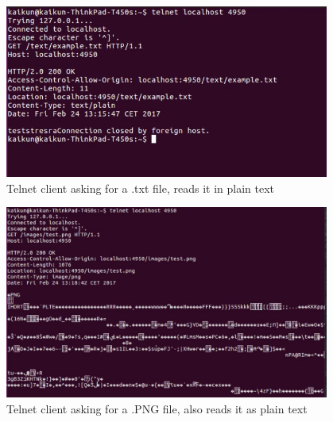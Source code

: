 \documentclass[a4paper,12pt]{article}
\numberwithin{figure}{section}
\begin{document}
\begin{figure}[h!]
	\centering
	\includegraphics[width=0.95\textwidth,keepaspectratio]{img/TEXT.jpg} 
	\caption{Telnet client asking for a .txt file, reads it in plain text}
	\label{TEXT}
\end{figure}

\begin{figure}[h!]
	\centering
	\includegraphics[width=0.95\textwidth,keepaspectratio]{img/IMAGE.jpg} 
	\caption{Telnet client asking for a .PNG file, also reads it as plain text}
	\label{IMAGE}
\end{figure}
\end{document}
